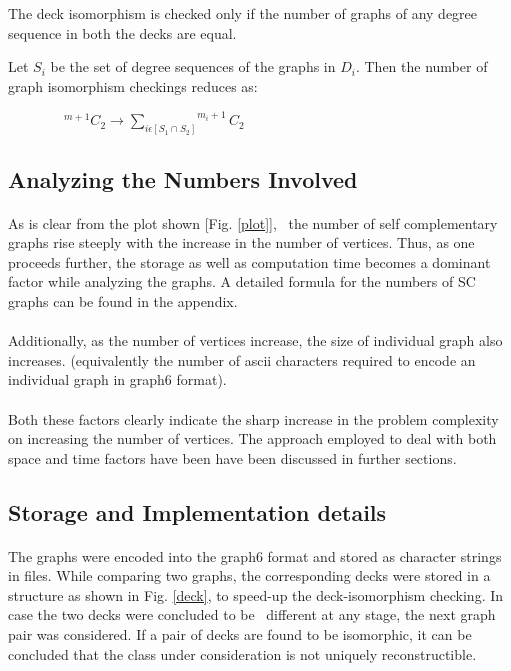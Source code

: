 \documentclass[12pt,conference]{IEEEtran}
\begin{document}
The deck isomorphism is checked only if the number of graphs of any degree sequence in both the decks are equal. 

Let $S_i$ be the set of degree sequences of the graphs in $D_i$. Then the number of graph isomorphism checkings reduces as:

\ \ \ \ \ \ \ \  $ ^{m+1}C_2 \rightarrow {\sum_{i \epsilon [S_1 \cap S_2 ^{}]}} ^{m_i+1}C_2 $ \\



\subsection{\label{2.4} Analyzing the Numbers Involved }
\paragraph*{} As is clear from the plot shown [Fig. \ref{plot}],  the number of self complementary graphs rise steeply with the increase in the number of vertices. Thus, as one proceeds further, the storage as well as computation time becomes a dominant factor while analyzing the graphs. A detailed formula for the numbers of SC graphs can be found in the appendix. 
\paragraph*{} Additionally, as the number of vertices increase, the size of individual graph also increases. (equivalently the number of ascii characters required to encode an individual graph in graph6\cite{b3} format). 
\paragraph*{} Both these factors clearly indicate the sharp increase in the problem complexity on increasing the number of vertices. The approach employed to deal with both space and time factors have been have been discussed in further sections. 


\subsection{\label{2.5} Storage and Implementation details }
\paragraph*{} The graphs were encoded into the graph6 format and stored as character strings in files. While comparing two graphs, the corresponding decks were stored in a structure as shown in Fig. \ref{deck}, to speed-up the deck-isomorphism checking. In case the two decks were concluded to be  different at any stage, the next graph pair was considered. If a pair of decks are found to be isomorphic, it can be concluded that the class under consideration is not uniquely reconstructible.
\end{document}
